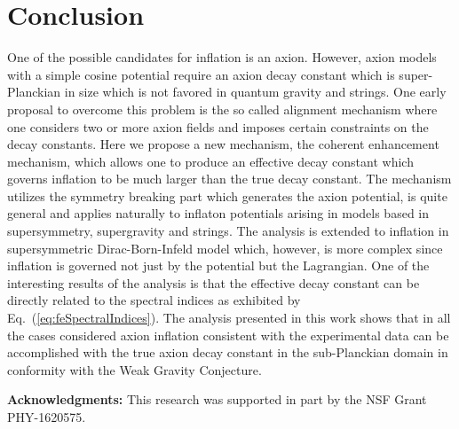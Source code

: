 \documentclass[12pt]{article}
\begin{document}
\section{Conclusion \label{sec:Conclusion}}
One of the possible candidates for inflation is an axion.
However, axion models with a simple cosine potential require an axion decay constant which is super-Planckian in size which is not favored in quantum gravity and strings.
One early proposal to overcome this problem is the so called alignment mechanism where one considers two or more axion fields and imposes certain constraints on the decay constants.
Here we propose a new mechanism, the coherent enhancement mechanism, which allows one to produce an effective decay constant which governs inflation to be much larger than the true decay constant.
The mechanism utilizes the symmetry breaking part which generates the axion potential, is quite general and applies naturally to inflaton potentials arising in models based in supersymmetry, supergravity and strings.
The analysis is extended to inflation in supersymmetric Dirac-Born-Infeld model which, however, is more complex since inflation is governed not just by the potential but the Lagrangian.
One of the interesting results of the analysis is that the effective decay constant can be directly related to the spectral indices as exhibited by Eq.~(\ref{eq:feSpectralIndices}).
The analysis presented in this work shows that in all the cases considered axion inflation consistent with the experimental data can be accomplished with the true axion decay constant in the sub-Planckian domain in conformity with the Weak Gravity Conjecture.

\textbf{Acknowledgments:}
This research was supported in part by the NSF Grant PHY-1620575.

\clearpage
\end{document}
